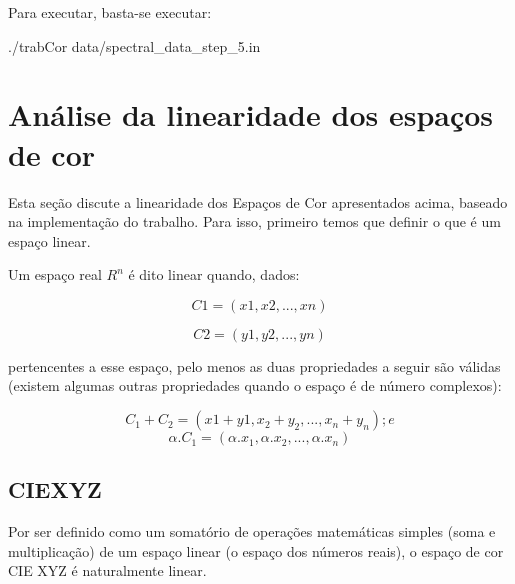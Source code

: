 \documentclass[a4paper,10pt]{report}
\begin{document}
\par
Para executar, basta-se executar:
\begin{list}{}{}
\item ./trabCor data/spectral_data_step_5.in
\end{list}



\section{Análise da linearidade dos espaços de cor}
\label{sec:analise_espacos_de_cor}
\par
Esta seção discute a linearidade dos Espaços de Cor apresentados acima, baseado
na implementação do trabalho. Para isso, primeiro temos que definir o que é um
espaço linear.

\par
Um espaço real $R^n$ é dito linear quando, dados:

\begin{equation}\label{eqC1}
C1=(x1,x2, ..., xn)
\end{equation}

\begin{equation}\label{eqC2}
C2=(y1, y2, ..., yn)
\end{equation}

\par
pertencentes a esse espaço, pelo menos as duas propriedades a seguir são válidas
(existem algumas outras propriedades quando o espaço é de número complexos):

\begin{equation}
C_1+C_2 = (x1+y1, x_2+y_2, ..., x_n+y_n); e
\end{equation}
\begin{equation}
\alpha.C_1 = (\alpha.x_1, \alpha.x_2, ..., \alpha.x_n)
\end{equation}

\subsection{CIEXYZ}
\par
Por ser definido como um somatório de operações matemáticas simples (soma e
multiplicação) de um espaço linear (o espaço dos números reais), o espaço de cor
CIE XYZ é naturalmente linear.
\end{document}
